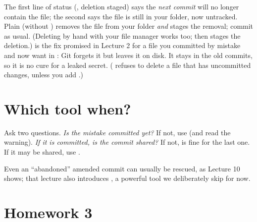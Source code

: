 The first line of status (, deletion staged) says the \emph{next commit} will no longer contain the file; the second says the file is still in your folder, now untracked. Plain  (without ) removes the file from your folder \emph{and} stages the removal; commit as usual. (Deleting by hand with your file manager works too; then  stages the deletion.)  is the fix promised in Lecture 2 for a file you committed by mistake and now want in : Git forgets it but leaves it on disk. It stays in the old commits, so it is no cure for a leaked secret. ( refuses to delete a file that has uncommitted changes, unless you add .)

\section{Which tool when?}

\begin{keyidea}
Ask two questions. \emph{Is the mistake committed yet?} If not, use  (and read the warning). \emph{If it is committed, is the commit shared?} If not,  is fine for the last one. If it may be shared, use .
\end{keyidea}

Even an ``abandoned'' amended commit can usually be rescued, as Lecture 10 shows; that lecture also introduces , a powerful tool we deliberately skip for now.

\section{Homework 3}

